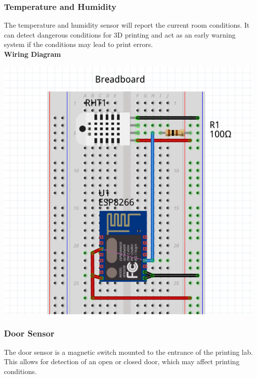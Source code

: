     \subsubsection{Temperature and Humidity}
      The temperature and humidity sensor will report the current room conditions. It
      can detect dangerous conditions for 3D printing and act as an early warning system
      if the conditions may lead to print errors.\\

      \textbf{Wiring Diagram}\\
            \begin{center}
      \includegraphics[scale=0.25]{images/temp-diagram.png}
\end{center}

    \subsubsection{Door Sensor}
      The door sensor is a magnetic switch mounted to the entrance of the printing lab.
      This allows for detection of an open or closed door, which may affect printing conditions.\\

